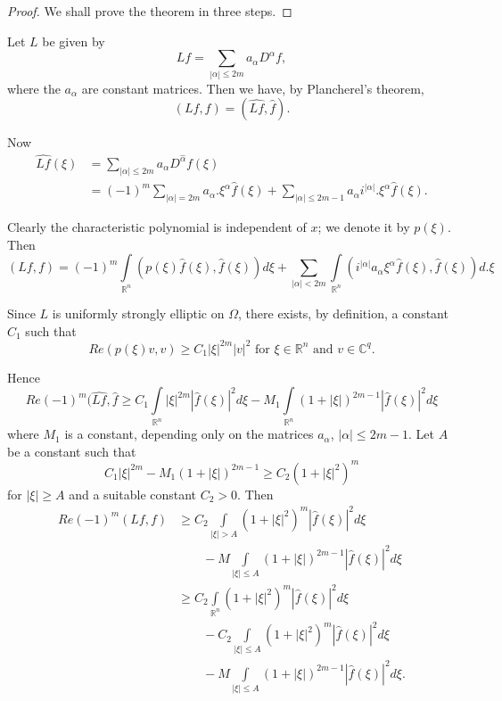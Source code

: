 \begin{proof}
We shall prove the theorem in three steps.
\end{proof}

\begin{step}\label{chap3:sec6:stepI} %
  Let $L$ be given by
  $$
  Lf = \sum_{| \alpha | \le 2 m} a_\alpha D^\alpha f,
  $$
  where the $a_\alpha$ are constant matrices. Then we have, by
  Plancherel's theorem, 
  $$
  (Lf, f ) = (\hat{Lf}, \hat{f}).
  $$
\end{step}

Now
\begin{align*}
  \hat{L f} (\xi) & = \sum_{| \alpha | \le 2m} a_\alpha
  D^{\hat{\alpha}} f (\xi )\\ 
  & = (-1)^m \sum_{| \alpha | = 2m} a_\alpha . \xi^\alpha \hat{f}
  (\xi) + \sum_{| \alpha | \le 2m -1} a_\alpha i^{| \alpha
    |}. \xi^{\alpha} \hat{f} (\xi). 
\end{align*}

Clearly the characteristic polynomial is independent of $x$; we denote
it by $p(\xi)$. Then  
$$
(Lf, f) = (-1)^m \int\limits_{\mathbb{R}^n} (p (\xi ) \hat{f} (\xi),
\hat{f} (\xi )) d \xi + \sum_{ | \alpha | < 2m}
\int\limits_{\mathbb{R}^n} (i^{| \alpha |} a_\alpha \xi^{\alpha }
\hat{f} (\xi), \hat{f} (\xi)) d. \xi 
$$

Since $L$ is uniformly strongly elliptic on $\Omega$, there exists, by
definition, a constant $C_1$ such that  
$$
Re (p (\xi ) v, v) \ge C_1 | \xi |^{2m} | v |^2 \text { for } \xi \in
\mathbb{R}^n \text { and } v \in \mathbb{C}^q. 
$$

Hence\pageoriginale 
$$
Re(-1)^m (\hat{Lf}, \hat{f} \ge C_1 \int\limits_{\mathbb{R}^n} |
\xi |^{2m} | \hat{f} (\xi) |^2 d \xi - M_1 \int\limits_{\mathbb{R}^n}
(1+ | \xi | )^{2m - 1} | \hat{f} (\xi ) |^2 d \xi 
$$
where $M_1$ is a constant, depending only on the matrices $a_\alpha$,
$| \alpha | \le 2m - 1$. Let $A$ be a constant such that  
$$
C_1 | \xi |^{2m} - M_1 (1+ | \xi|)^{2m -1} \ge C_2 ( 1 + | \xi |^2 )^m
$$
for $| \xi | \ge A$ and a suitable constant $C_2 > 0$. Then 
\begin{align*}
  Re (-1)^m (Lf, f ) & \ge C_2 \int\limits_{| \xi | > A} (1+ | \xi |^2
  )^m | \hat{f} (\xi) |^2 d \xi\\ 
  & \qquad  - M \int\limits_{| \xi | \le A} (1 +
  | \xi | )^{2m - 1} | \hat{f} (\xi) |^2 d \xi\\ 
  & \ge C_2 \int\limits_{\mathbb{R}^n} (1+ | \xi |^2 )^m | \hat{f}
  (\xi ) |^2 d \xi\\ 
  & \qquad - C_2 \int\limits_{| \xi | \le A} (1+ | \xi |^2)^m
  | \hat{f} (\xi) |^2 d \xi\\ 
  & \qquad - M \int\limits_{| \xi | \le A} (1+ | \xi
  | )^{2m - 1} | \hat{f} (\xi) |^2 d \xi.
\end{align*}

